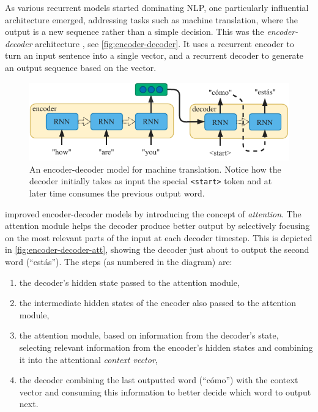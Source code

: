 \documentclass[bsc,frontabs,twoside,singlespacing,parskip,deptreport]{infthesis}
\begin{document}
{{    %
    As various recurrent models started dominating NLP, one particularly influential architecture emerged, addressing tasks such as machine translation, where the output is a new sequence rather than a simple decision. This was the \textit{encoder-decoder} architecture \citep{Kalchbrenner_2013,Sutskever_2014}, see \autoref{fig:encoder-decoder}. It uses a recurrent encoder to turn an input sentence into a single vector, and a recurrent decoder to generate an output sequence based on the vector.
    \begin{figure}[h!t]
      \centering
      \includegraphics[width=11.5cm]{graphics/encoder-decoder}
      \cprotect\caption{An encoder-decoder model for machine translation. Notice how the decoder initially takes as input the special \verb|<start>| token and at later time consumes the previous output word.}
      \label{fig:encoder-decoder}
    \end{figure}

    \citet{Bahdanau_2014} improved encoder-decoder models by introducing the concept of \textit{attention}. The attention module helps the decoder produce better output by selectively focusing on the most relevant parts of the input at each decoder timestep. This is depicted in \autoref{fig:encoder-decoder-att}, showing the decoder just about to output the second word (``est\'as''). The steps (as numbered in the diagram) are:
    \begin{enumerate}
      \item the decoder's hidden state passed to the attention module,
      \item the intermediate hidden states of the encoder also passed to the attention module,
      \item the attention module, based on information from the decoder's state, selecting relevant information from the encoder's hidden states and combining it into the attentional \textit{context vector},
      \item the decoder combining the last outputted word (``c\'omo'') with the context vector and consuming this information to better decide which word to output next. 
    \end{enumerate}

}}
\end{document}
